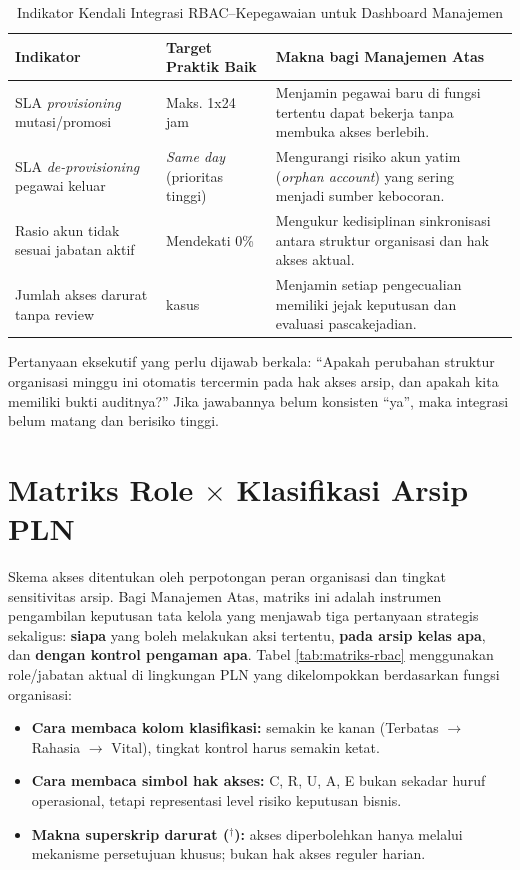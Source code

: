 \documentclass[12pt,a4paper]{report}
\begin{document}
\begin{table}[htbp]
\centering
\small
\caption{Indikator Kendali Integrasi RBAC--Kepegawaian untuk Dashboard Manajemen}
\label{tab:kpi-rbac-hr}
\begin{tabularx}{\textwidth}{@{} >{\raggedright\arraybackslash}p{3.2cm} >{\raggedright\arraybackslash}p{2.8cm} X @{}}
\toprule
\textbf{Indikator} & \textbf{Target Praktik Baik} & \textbf{Makna bagi Manajemen Atas} \\
\midrule
SLA \textit{provisioning} mutasi/promosi & Maks. 1x24 jam & Menjamin pegawai baru di fungsi tertentu dapat bekerja tanpa membuka akses berlebih. \\
SLA \textit{de-provisioning} pegawai keluar & \textit{Same day} (prioritas tinggi) & Mengurangi risiko akun yatim (\textit{orphan account}) yang sering menjadi sumber kebocoran. \\
Rasio akun tidak sesuai jabatan aktif & Mendekati 0\% & Mengukur kedisiplinan sinkronisasi antara struktur organisasi dan hak akses aktual. \\
Jumlah akses darurat tanpa review & 0 kasus & Menjamin setiap pengecualian memiliki jejak keputusan dan evaluasi pascakejadian. \\
\bottomrule
\end{tabularx}
\end{table}

Pertanyaan eksekutif yang perlu dijawab berkala: ``Apakah perubahan struktur organisasi minggu ini otomatis tercermin pada hak akses arsip, dan apakah kita memiliki bukti auditnya?'' Jika jawabannya belum konsisten ``ya'', maka integrasi belum matang dan berisiko tinggi.

\section{Matriks Role \texorpdfstring{$\times$}{x} Klasifikasi Arsip PLN}
Skema akses ditentukan oleh perpotongan peran organisasi dan tingkat sensitivitas arsip. Bagi Manajemen Atas, matriks ini adalah instrumen pengambilan keputusan tata kelola yang menjawab tiga pertanyaan strategis sekaligus: \textbf{siapa} yang boleh melakukan aksi tertentu, \textbf{pada arsip kelas apa}, dan \textbf{dengan kontrol pengaman apa}. Tabel \ref{tab:matriks-rbac} menggunakan role/jabatan aktual di lingkungan PLN yang dikelompokkan berdasarkan fungsi organisasi:

\begin{itemize}[leftmargin=*]
  \item \textbf{Cara membaca kolom klasifikasi:} semakin ke kanan (Terbatas $\rightarrow$ Rahasia $\rightarrow$ Vital), tingkat kontrol harus semakin ketat.
  \item \textbf{Cara membaca simbol hak akses:} C, R, U, A, E bukan sekadar huruf operasional, tetapi representasi level risiko keputusan bisnis.
  \item \textbf{Makna superskrip darurat ($^{\dagger}$):} akses diperbolehkan hanya melalui mekanisme persetujuan khusus; bukan hak akses reguler harian.
\end{itemize}
\end{document}
